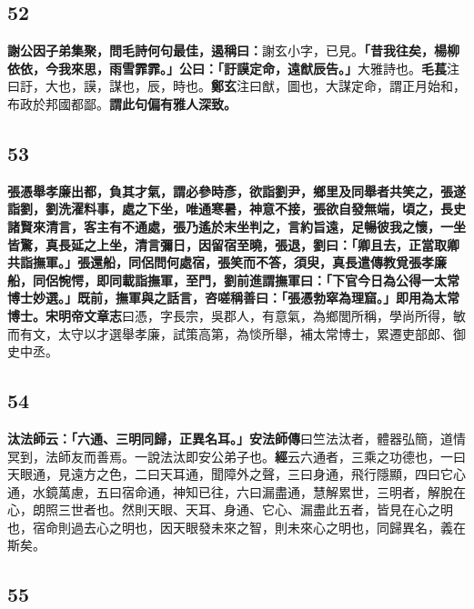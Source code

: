 \subsection*{52}

\textbf{謝公因子弟集聚，問毛詩何句最佳，遏稱曰：}{\footnotesize 謝玄小字，已見。}\textbf{「昔我往矣，楊柳依依，今我來思，雨雪霏霏。」公曰：「訏謨定命，遠猷辰告。」}{\footnotesize 大雅詩也。\textbf{毛萇}注曰訏，大也，謨，謀也，辰，時也。\textbf{鄭玄}注曰猷，圖也，大謀定命，謂正月始和，布政於邦國都鄙。}\textbf{謂此句偏有雅人深致。}

\subsection*{53}

\textbf{張憑舉孝廉出都，負其才氣，謂必參時彥，欲詣劉尹，鄉里及同舉者共笑之，張遂詣劉，劉洗濯料事，處之下坐，唯通寒暑，神意不接，張欲自發無端，頃之，長史諸賢來清言，客主有不通處，張乃遙於末坐判之，言約旨遠，足暢彼我之懷，一坐皆驚，真長延之上坐，清言彌日，因留宿至曉，張退，劉曰：「卿且去，正當取卿共詣撫軍。」張還船，同侶問何處宿，張笑而不答，須臾，真長遣傳教覓張孝廉船，同侶惋愕，即同載詣撫軍，至門，劉前進謂撫軍曰：「下官今日為公得一太常博士妙選。」既前，撫軍與之話言，咨嗟稱善曰：「張憑勃窣為理窟。」即用為太常博士。}{\footnotesize \textbf{宋明帝文章志}曰憑，字長宗，吳郡人，有意氣，為鄉閭所稱，學尚所得，敏而有文，太守以才選舉孝廉，試策高第，為惔所舉，補太常博士，累遷吏部郎、御史中丞。}

\subsection*{54}

\textbf{汰法師云：「六通、三明同歸，正異名耳。」}{\footnotesize \textbf{安法師傳}曰竺法汰者，體器弘簡，道情冥到，法師友而善焉。一說法汰即安公弟子也。\textbf{經}云六通者，三乘之功德也，一曰天眼通，見遠方之色，二曰天耳通，聞障外之聲，三曰身通，飛行隱顯，四曰它心通，水鏡萬慮，五曰宿命通，神知已往，六曰漏盡通，慧解累世，三明者，解脫在心，朗照三世者也。然則天眼、天耳、身通、它心、漏盡此五者，皆見在心之明也，宿命則過去心之明也，因天眼發未來之智，則未來心之明也，同歸異名，義在斯矣。}

\subsection*{55}

